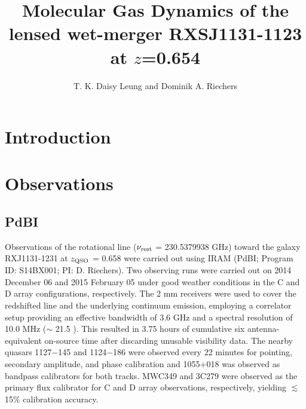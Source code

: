 \documentclass[]{emulateapj}
\begin{document}

\title{Molecular Gas Dynamics of the lensed wet-merger RXSJ1131-1123 at $z$=0.654}
\author{T. K. Daisy Leung and Dominik A. Riechers}

\begin{abstract}
\end{abstract}


\section{Introduction}

\section{Observations}
\subsection{PdBI \bco} %
Observations of the \bco rotational line ($\nu_{\rm rest}$ = 230.5379938 GHz)
toward the \gl galaxy RXJ1131-1231 at $z_{\rm QSO}$ =
0.658 were carried out using IRAM \pdbi (PdBI; Program ID: S14BX001; PI: D.
Riechers). Two observing runs were carried out on 2014 December 06 and 2015
February 05 under good weather conditions in the C and D array configurations,
respectively. The 2 mm receivers were used to cover the redshifted \bco line
and the underlying continuum emission, employing a correlator setup providing
an effective bandwidth of 3.6 GHz and a spectral resolution of 10.0 MHz ($\sim$
21.5 \kms). This resulted in 3.75 hours of cumulative six antenna-equivalent on-source
 time after discarding unusable visibility data.
The nearby quasars 1127$-$145 and 1124$-$186 were observed every 22 minutes
for pointing, secondary amplitude, and phase calibration and 1055$+$018 was
observed as bandpass calibrators for both tracks.
MWC349 and 3C279 were observed as the primary flux calibrator for C and D
array observations, respectively, yielding $\lesssim$15\% calibration accuracy.
\end{document}
